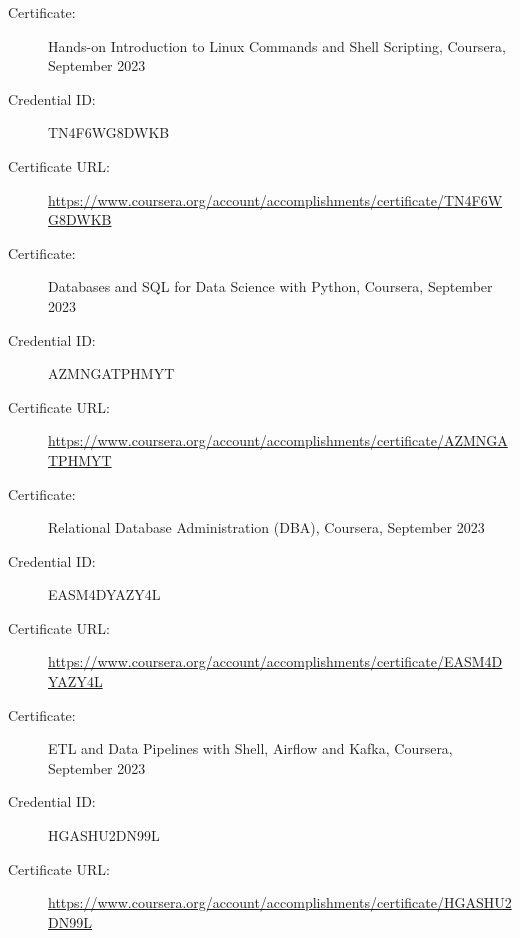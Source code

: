 \documentclass[a4paper,10pt]{article}
\begin{document}
\vspace{1pt} %

\begin{description}
    \item[Certificate:] Hands-on Introduction to Linux Commands and Shell Scripting, Coursera, September 2023
    \item[Credential ID:] TN4F6WG8DWKB
    \item[Certificate URL:] \url{https://www.coursera.org/account/accomplishments/certificate/TN4F6WG8DWKB}
\end{description}

\vspace{1pt} %

\begin{description}
    \item[Certificate:] Databases and SQL for Data Science with Python, Coursera, September 2023
    \item[Credential ID:]  AZMNGATPHMYT
    \item[Certificate URL:] \url{https://www.coursera.org/account/accomplishments/certificate/AZMNGATPHMYT}
\end{description}

\vspace{1pt} %

\begin{description}
    \item[Certificate:] Relational Database Administration (DBA), Coursera, September 2023
    \item[Credential ID:] EASM4DYAZY4L
    \item[Certificate URL:] \url{https://www.coursera.org/account/accomplishments/certificate/EASM4DYAZY4L}
\end{description}

\vspace{1pt} %

\begin{description}
    \item[Certificate:] ETL and Data Pipelines with Shell, Airflow and Kafka, Coursera, September 2023
    \item[Credential ID:] HGASHU2DN99L
    \item[Certificate URL:] \url{https://www.coursera.org/account/accomplishments/certificate/HGASHU2DN99L}
\end{description}
\end{document}
